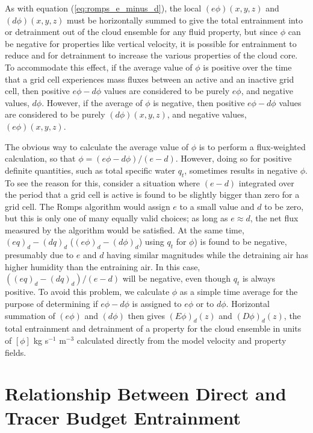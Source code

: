 \documentclass[12pt]{article}
\begin{document}
As with equation (\ref{eq:romps_e_minus_d}), the local $(e\phi)(x,y,z)$
and $(d\phi)(x,y,z)$ must be horizontally summed to give the total entrainment 
into or detrainment out of the cloud ensemble for any fluid property, but
since $\phi$ can be negative for properties like vertical velocity, it is 
possible for entrainment to reduce and for detrainment to increase the 
various properties of the cloud core.  To accommodate this effect, if the 
average value of $\phi$ is positive over the time that a grid cell experiences 
mass fluxes between an active and an inactive grid cell, then positive 
$e\phi-d\phi$ values are considered to be purely $e\phi$, and negative values, 
$d\phi$.  However, if the average of $\phi$ is negative, then positive 
$e\phi-d\phi$ values are considered to be purely $(d\phi)(x,y,z)$, and negative 
values, $(e\phi)(x,y,z)$.

The obvious way to calculate the average value of $\phi$ is to perform a 
flux-weighted calculation, so that $\phi = (e\phi - d\phi)/(e - d)$.  
However, doing so for positive definite quantities, such as total specific 
water $q_t$, sometimes results in negative $\phi$.  To see the reason 
for this, consider a situation where $(e - d)$ integrated over the period 
that a grid cell is active is found to be slightly bigger than zero for 
a grid cell.  The Romps algorithm would assign $e$ to a small value and 
$d$ to be zero, but this is only one of many equally valid choices; as 
long as $e \approx d$, the net flux measured by the algorithm would be 
satisfied.  At the same time, $(e q)_d - (d q)_d$ 
($(e \phi)_d - (d \phi)_d$) using $q_t$ for $\phi$) is found to be 
negative, presumably due to $e$ and $d$ having similar magnitudes while 
the detraining air has higher humidity than the entraining air.  In this 
case, $((e q)_d - (d q)_d)/(e-d)$ will be negative, even though $q_t$ is 
always positive.  To avoid this problem, we calculate $\phi$ as a simple 
time average for the purpose of determining if $e\phi-d\phi$ is 
assigned to $e\phi$ or to $d\phi$.  Horizontal summation of $(e\phi)$ 
and $(d\phi)$ then gives $(E\phi)_d(z)$ and $(D\phi)_d(z)$, the total 
entrainment and detrainment of a property for the cloud ensemble in 
units of $[\phi]$ kg s$^{-1}$ m$^{-3}$ calculated directly from the 
model velocity and property fields.


\section{Relationship Between Direct and Tracer Budget Entrainment}
\end{document}
